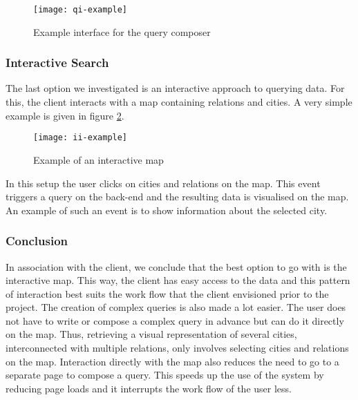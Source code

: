 \begin{figure}[ht]
\centering
\texttt{[image: qi-example]}
\caption{Example interface for the query composer}
\label{fig:qi-example}
\end{figure}

\subsubsection{Interactive Search}

The last option we investigated is an interactive approach to querying data. For this, the client interacts with a map containing relations and cities. A very simple example is given in figure \ref{fig:ii-example}.

\begin{figure}[ht]
\centering
\texttt{[image: ii-example]}
\caption{Example of an interactive map}
\label{fig:ii-example}
\end{figure}

In this setup the user clicks on cities and relations on the map. This event triggers a query on the back-end and the resulting data is visualised on the map. An example of such an event is to show information about the selected city.

\subsubsection{Conclusion}

In association with the client, we conclude that the best option to go with is the interactive map.
This way, the client has easy access to the data and this pattern of interaction best suits the work flow that the client envisioned prior to the project. The creation of complex queries is also made a lot easier. The user does not have to write or compose a complex query in advance but can do it directly on the map. Thus, retrieving a visual representation of several cities, interconnected with multiple relations, only involves selecting cities and relations on the map. Interaction directly with the map also reduces the need to go to a separate page to compose a query. This speeds up the use of the system by reducing page loads and it interrupts the work flow of the user less.